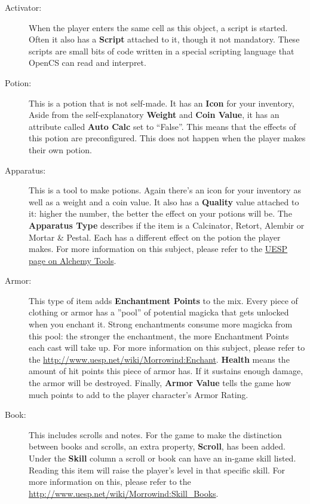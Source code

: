 \begin{description}
 \item[Activator:] When the player enters the same cell as this object, a script is started. Often it also has a \textbf{Script} attached to it, though it not mandatory. These scripts are small bits of code written in a special scripting language that OpenCS can read and interpret.
 \item[Potion:] This is a potion that is not self-made. It has an \textbf{Icon} for your inventory, Aside from the self-explanatory \textbf{Weight} and \textbf{Coin Value}, it has an attribute called \textbf{Auto Calc} set to ``False''. This means that the effects of this potion are preconfigured. This does not happen when the player makes their own potion.
 \item[Apparatus:] This is a tool to make potions. Again there's an icon for your inventory as well as a weight and a coin value. It also has a \textbf{Quality} value attached to it: higher the number, the better the effect on your potions will be. The \textbf{Apparatus Type} describes if the item is a Calcinator, Retort, Alembir or Mortar & Pestal. Each has a different effect on the potion the player makes. For more information on this subject, please refer to the \href{http://www.uesp.net/wiki/Morrowind:Alchemy#Tools}{UESP page on Alchemy Tools}.
 \item[Armor:] This type of item adds \textbf{Enchantment Points} to the mix. Every piece of clothing or armor has a ''pool'' of potential magicka that gets unlocked when you enchant it. Strong enchantments consume more magicka from this pool: the stronger the enchantment, the more Enchantment Points each cast will take up. For more information on this subject, please refer to the \href{Enchant page on UESP}{http://www.uesp.net/wiki/Morrowind:Enchant}. \textbf{Health} means the amount of hit points this piece of armor has. If it sustains enough damage, the armor will be destroyed. Finally, \textbf{Armor Value} tells the game how much points to add to the player character's Armor Rating.
 \item[Book:] This includes scrolls and notes. For the game to make the distinction between books and scrolls, an extra property, \textbf{Scroll}, has been added. Under the \textbf{Skill} column a scroll or book can have an in-game skill listed. Reading this item will raise the player's level in that specific skill. For more information on this, please refer to the \href{Skill Books page on UESP}{http://www.uesp.net/wiki/Morrowind:Skill_Books}.

\end{description}
